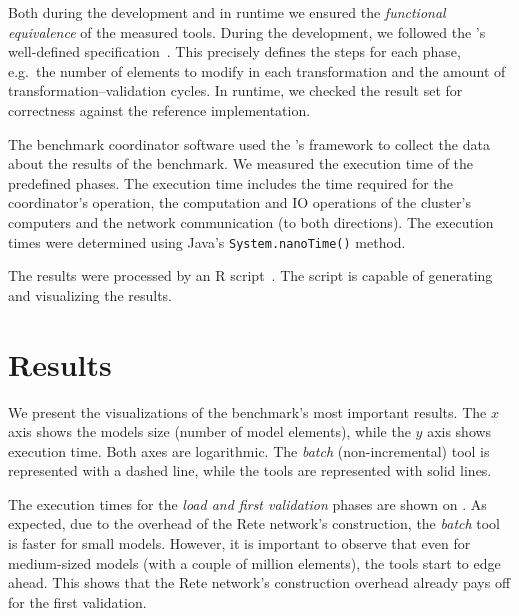Both during the development and in runtime we ensured the \emph{functional equivalence} of the measured tools. During the development, we followed the \tb{}'s well-defined specification~\cite{ASE2013}. This precisely defines the steps for each phase, e.g.\ the number of elements to modify in each transformation and the amount of transformation--validation cycles. In runtime, we checked the result set for correctness against the reference implementation. 

The benchmark coordinator software used the \tb{}'s framework to collect the data about the results of the benchmark. We measured the execution time of the predefined phases. The execution time includes the time required for the coordinator's operation, the computation and IO operations of the cluster's computers and the network communication (to both directions). The execution times were determined using Java's \texttt{System.nanoTime()} method.

The results were processed by an R script~\cite{RProject}. The script is capable of generating and visualizing the results. 


\section{Results}
\label{evaluation-results}


We present the visualizations of the benchmark's most important results. The $x$ axis shows the models size (number of model elements), while the $y$ axis shows execution time. Both axes are logarithmic. The \emph{batch} (non-incremental) tool is represented with a dashed line, while the \iqd{} tools are represented with solid lines.


The execution times for the \emph{load and first validation} phases are shown on .
As expected, due to the overhead of the Rete network's construction, the \emph{batch} tool is faster for small models. However, it is important to observe that even for medium-sized models (with a couple of million elements), the \iqd{} tools start to edge ahead. This shows that the Rete network's construction overhead already pays off for the first validation.

